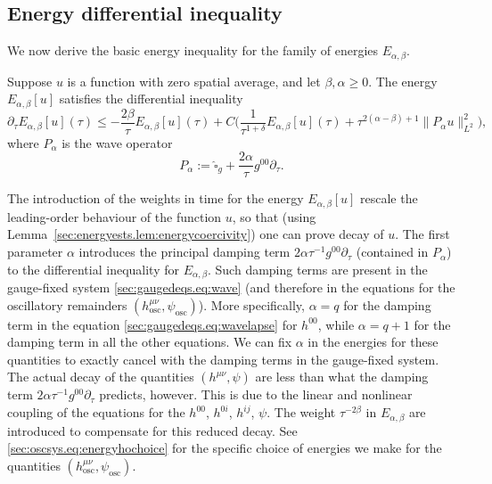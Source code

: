 \documentclass{article}
\newcommand{\osc}{\mathrm{osc}}
\newcommand{\wh}{\widehat}
\newcommand{\pa}{\partial}
\begin{document}
\subsection{Energy differential inequality}
We now derive the basic energy inequality for the family of energies $E_{\alpha,\beta}$.
\begin{lemma}\label{sec:energyests.lem:energyineq}
    Suppose $u$ is a function with zero spatial average, and let $\beta, \alpha \geq 0$. The energy $E_{\alpha,\beta}[u]$ satisfies the differential inequality
    \begin{subequations}
        \begin{equation}\label{sec:energyests.eq:energyineq}
            \pa_\tau E_{\alpha,\beta}[u](\tau) \leq -\frac{2\beta}{\tau}E_{\alpha,\beta}[u](\tau) +C\Big(\frac{1}{\tau^{1+\delta}}E_{\alpha,\beta}[u](\tau)+ \tau^{2(\alpha - \beta) +1}\|P_\alpha u\|_{L^2}^2\Big),
        \end{equation}
    \end{subequations}
    where $P_\alpha$ is the wave operator
    \begin{equation}
    P_\alpha := \wh{\square}_g + \frac{2\alpha}{\tau}g^{00}\pa_\tau.
\end{equation}
\end{lemma}
\begin{remark}
    The introduction of the weights in time for the energy $E_{\alpha,\beta}[u]$ rescale the leading-order behaviour of the function $u$, so that (using Lemma~\ref{sec:energyests.lem:energycoercivity}) one can prove decay of $u$. The first parameter $\alpha$ introduces the principal damping term $2\alpha\tau^{-1}g^{00}\pa_\tau$ (contained in $P_{\alpha}$) to the differential inequality for $E_{\alpha,\beta}$. Such damping terms are present in the gauge-fixed system \eqref{sec:gaugedeqs.eq:wave} (and therefore in the equations for the oscillatory remainders $(h_{\osc}^{\mu\nu},\psi_{\osc})$). More specifically, $\alpha = q$ for the damping term in the equation \eqref{sec:gaugedeqs.eq:wavelapse} for $h^{00}$, while $\alpha = q+1$ for the damping term in all the other equations. We can fix $\alpha$ in the energies for these quantities to exactly cancel with the damping terms in the gauge-fixed system. The actual decay of the quantities $(h^{\mu\nu},\psi)$ are less than what the damping term $2\alpha\tau^{-1}g^{00}\pa_\tau$ predicts, however. This is due to the linear and nonlinear coupling of the equations for the $h^{00}$, $h^{0i}$, $h^{ij}$, $\psi$. The weight $\tau^{-2\beta}$ in $E_{\alpha,\beta}$ are introduced to compensate for this reduced decay. See \eqref{sec:oscsys.eq:energyhochoice} for the specific choice of energies we make for the quantities $(h_{\osc}^{\mu\nu},\psi_{\osc})$.
\end{remark}
\end{document}
